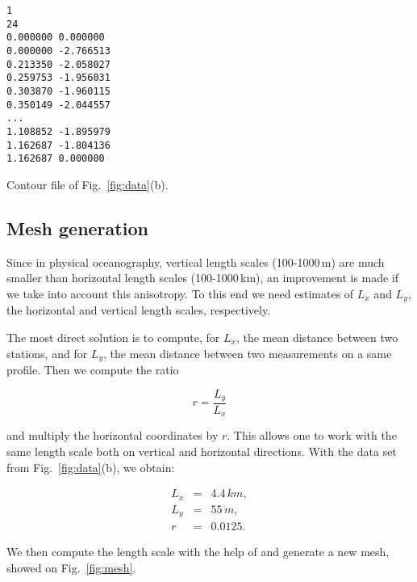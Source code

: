 \begin{exfile}
\begin{footnotesize}
\begin{verbatim}
1 
24 
0.000000 0.000000 
0.000000 -2.766513 
0.213350 -2.058027 
0.259753 -1.956031 
0.303870 -1.960115 
0.350149 -2.044557 
...
1.108852 -1.895979 
1.162687 -1.804136 
1.162687 0.000000 

\end{verbatim}
\end{footnotesize}
\caption{Contour file of Fig.~\ref{fig:data}(b).\label{exfile:contour}}
\end{exfile}


\subsection{Mesh generation\label{sec:meshscale}}



Since in physical oceanography, vertical length scales (100-1000\,m) are much smaller than horizontal length scales (100-1000\,km), an improvement is  made if we take into account this anisotropy. To this end we need estimates of $L_{x}$ and $L_{y}$, the horizontal and vertical length scales, respectively.


The most direct solution is to compute, for $L_{x}$, the mean distance between two stations, and for $L_{y}$, the mean distance between two measurements on a same profile. Then we compute the ratio

\[r = \frac{L_y}{L_x}\]

and multiply the horizontal coordinates by $r$. This allows one to work with the same length scale both on vertical and horizontal directions. With the  data set from Fig.~\ref{fig:data}(b), we obtain:

\begin{eqnarray*}
L_{x} &=& 4.4\,km,\\
L_{y} &=& 55\,m,\\
	r   &=& 0.0125.
\end{eqnarray*}

We then compute the length scale with the help of  and generate a new mesh, showed on Fig.~\ref{fig:mesh}. 

